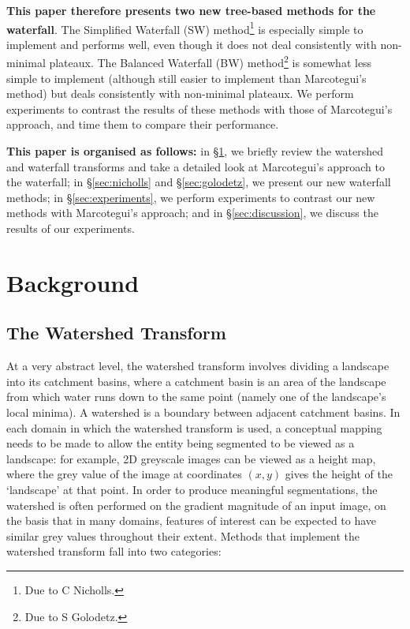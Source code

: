 \documentclass[preprint,a4paper]{elsarticle}
\begin{document}
\pagebreak

\textbf{This paper therefore presents two new tree-based methods for the waterfall}. The Simplified Waterfall (SW) method\footnote{Due to C Nicholls.} is especially simple to implement and performs well, even though it does not deal consistently with non-minimal plateaux. The Balanced Waterfall (BW) method\footnote{Due to S Golodetz.} is somewhat less simple to implement (although still easier to implement than Marcotegui's method) but deals consistently with non-minimal plateaux. We perform experiments to contrast the results of these methods with those of Marcotegui's approach, and time them to compare their performance.

\textbf{This paper is organised as follows:} in \S\ref{sec:background}, we briefly review the watershed and waterfall transforms and take a detailed look at Marcotegui's approach to the waterfall; in \S\ref{sec:nicholls} and \S\ref{sec:golodetz}, we present our new waterfall methods; in \S\ref{sec:experiments}, we perform experiments to contrast our new methods with Marcotegui's approach; and in \S\ref{sec:discussion}, we discuss the results of our experiments.

\section{Background}
\label{sec:background}

\subsection{The Watershed Transform}

At a very abstract level, the watershed transform involves dividing a landscape into its catchment basins, where a catchment basin is an area of the landscape from which water runs down to the same point (namely one of the landscape's local minima). A watershed is a boundary between adjacent catchment basins. In each domain in which the watershed transform is used, a conceptual mapping needs to be made to allow the entity being segmented to be viewed as a landscape: for example, 2D greyscale images can be viewed as a height map, where the grey value of the image at coordinates $(x,y)$ gives the height of the `landscape' at that point. In order to produce meaningful segmentations, the watershed is often performed on the gradient magnitude of an input image, on the basis that in many domains, features of interest can be expected to have similar grey values throughout their extent. Methods that implement the watershed transform fall into two categories:
\end{document}
